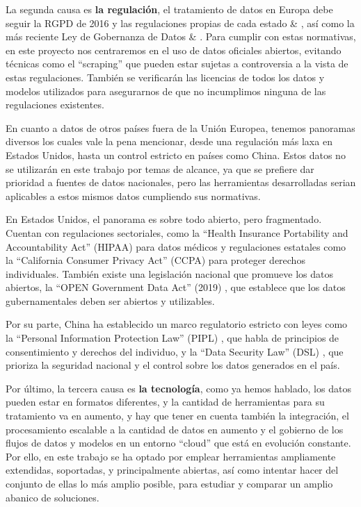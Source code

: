 	La segunda causa es \textbf{la regulación}, el tratamiento de datos en Europa debe seguir la RGPD de 2016 y las regulaciones propias de cada estado \citep{LicenciasLibres2017Datos} \& \citep{webRGPD2016Europa}, así como la más reciente Ley de Gobernanza de Datos \citep{webLGD2023Europa} \& \citep{DatosAbiertos2022Cloud}. Para cumplir con estas normativas, en este proyecto nos centraremos en el uso de datos oficiales abiertos, evitando técnicas como el ``scraping'' que pueden estar sujetas a controversia a la vista de estas regulaciones. También se verificarán las licencias de todos los datos y modelos utilizados para asegurarnos de que no incumplimos ninguna de las regulaciones existentes.
	
	En cuanto a datos de otros países fuera de la Unión Europea, tenemos panoramas diversos los cuales vale la pena mencionar, desde una regulación más laxa en Estados Unidos, hasta un control estricto en países como China. Estos datos no se utilizarán en este trabajo por temas de alcance, ya que se prefiere dar prioridad a fuentes de datos nacionales, pero las herramientas desarrolladas serian aplicables a estos mismos datos cumpliendo sus normativas.
	
	En Estados Unidos, el panorama es sobre todo abierto, pero fragmentado. Cuentan con regulaciones sectoriales, como la ``Health Insurance Portability and Accountability Act'' (HIPAA) para datos médicos \citep{webHIPAA1996EEUU} y regulaciones estatales como la ``California Consumer Privacy Act'' (CCPA) \citep{webCCPA2018California} para proteger derechos individuales. También existe una legislación nacional que promueve los datos abiertos, la ``OPEN Government Data Act'' (2019) \citep{webOGDA2019EEUU}, que establece que los datos gubernamentales deben ser abiertos y utilizables.
	
	Por su parte, China ha establecido un marco regulatorio estricto con leyes como la ``Personal Information Protection Law'' (PIPL) \citep{webPIPL2021China}, que habla de principios de consentimiento y derechos del individuo, y la ``Data Security Law'' (DSL) \citep{webDSL2021China}, que prioriza la seguridad nacional y el control sobre los datos generados en el país.
	
	
	Por último, la tercera causa es \textbf{la tecnología}, como ya hemos hablado, los datos pueden estar en formatos diferentes, y la cantidad de herramientas para su tratamiento va en aumento, y hay que tener en cuenta también la integración, el procesamiento escalable a la cantidad de datos en aumento y el gobierno de los flujos de datos y modelos en un entorno ``cloud'' que está en evolución constante. Por ello, en este trabajo se ha optado por emplear herramientas ampliamente extendidas, soportadas, y principalmente abiertas, así como intentar hacer del conjunto de ellas lo más amplio posible, para estudiar y comparar un amplio abanico de soluciones.

